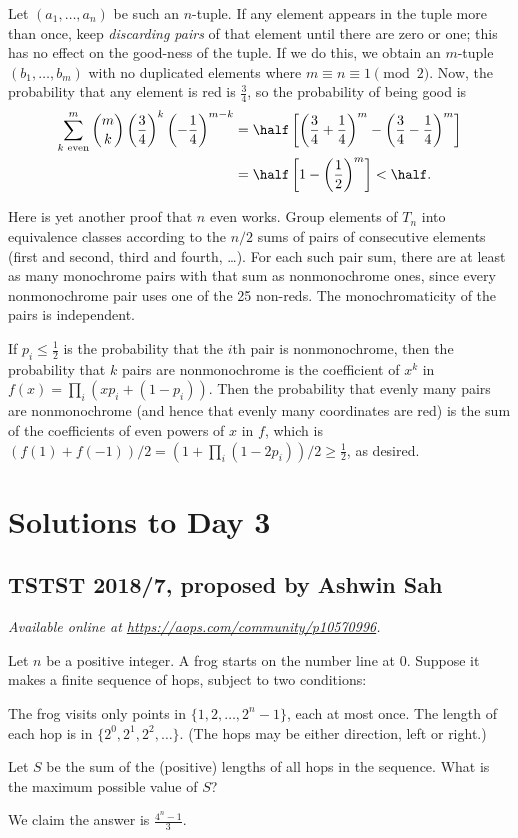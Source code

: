 \documentclass[11pt]{scrartcl}
\begin{document}
Let $(a_1, \dots, a_n)$ be such an $n$-tuple.
If any element appears in the tuple more than once,
keep \emph{discarding pairs} of that element until there are zero or one;
this has no effect on the good-ness of the tuple.
If we do this, we obtain an $m$-tuple $(b_1, \dots, b_m)$
with no duplicated elements where $m \equiv n \equiv 1 \pmod 2$.
Now, the probability that any element is red is $\frac34$,
so the probability of being good is
\begin{align*}
  \sum_{k \text{ even}}^m \binom{m}{k} \left( \frac 34 \right)^k
  \left( -\frac 14 \right)^{m-k}
  &= \half\left[ \left( \frac34 + \frac 14 \right)^m
    - \left( \frac 34 - \frac 14 \right)^m \right] \\
  &= \half \left[ 1 - \left( \frac12 \right)^m \right] < \half.
\end{align*}

\begin{remark*}
  Here is yet another proof that $n$ even works.
  Group elements of $T_n$ into equivalence classes
  according to the $n/2$ sums of pairs of consecutive elements
  (first and second, third and fourth, \dots).
  For each such pair sum, there are at least as many monochrome pairs
  with that sum as nonmonochrome ones, since every nonmonochrome pair uses one of the 25 non-reds.
  The monochromaticity of the pairs is independent.

  If $p_i \le \frac12$ is the probability that the $i$th pair is nonmonochrome,
  then the probability that $k$ pairs are nonmonochrome
  is the coefficient of $x^k$ in $f(x) = \prod_i(xp_i+(1-p_i))$.
  Then the probability that evenly many pairs are nonmonochrome
  (and hence that evenly many coordinates are red)
  is the sum of the coefficients of even powers of $x$ in $f$,
  which is $(f(1) + f(-1))/2 = (1 + \prod_i(1-2p_i))/2 \ge \frac12$,
  as desired.
\end{remark*}
\pagebreak

\section{Solutions to Day 3}
\subsection{TSTST 2018/7, proposed by Ashwin Sah}
\textsl{Available online at \url{https://aops.com/community/p10570996}.}
\begin{mdframed}[style=mdpurplebox,frametitle={Problem statement}]
Let $n$ be a positive integer.
A frog starts on the number line at $0$.
Suppose it makes a finite sequence of hops, subject to two conditions:
\begin{itemize}
  \ii The frog visits only points in $\{1, 2, \dots, 2^n-1\}$,
  each at most once.
  \ii The length of each hop is in $\{2^0, 2^1, 2^2, \dots\}$.
  (The hops may be either direction, left or right.)
\end{itemize}
Let $S$ be the sum of the (positive) lengths of all hops in the sequence.
What is the maximum possible value of $S$?
\end{mdframed}
We claim the answer is $\frac{4^n - 1}{3}$.
\end{document}
